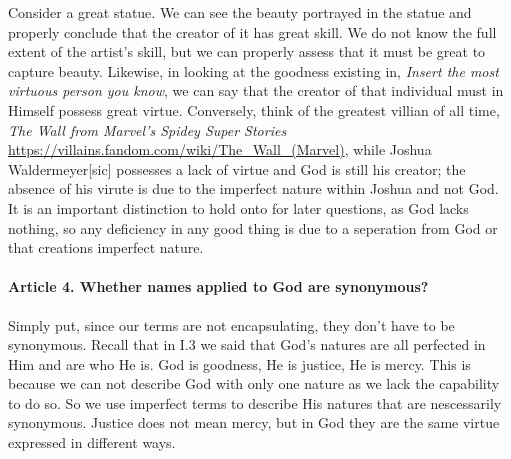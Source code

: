 \documentclass{ucetd}
\begin{document}
Consider a great statue. We can see the beauty portrayed in the statue and properly conclude that the creator of it has great skill. We do not know the full extent of the artist's skill, but we can properly assess that it must be great to capture beauty. Likewise, in looking at the goodness existing in, \textit{Insert the most virtuous person you know}, we can say that the creator of that individual must in Himself possess great virtue.
Conversely, think of the greatest villian of all time, \textit{The Wall from Marvel's Spidey Super Stories} \url{https://villains.fandom.com/wiki/The_Wall_(Marvel)}, while Joshua Waldermeyer[sic] possesses a lack of virtue and God is still his creator; the absence of his virute is due to the imperfect nature within Joshua and not God. It is an important distinction to hold onto for later questions, as God lacks nothing, so any deficiency in any good thing is due to a seperation from God or that creations imperfect nature. 

\paragraph{Article 4. Whether names applied to God are synonymous?}
Simply put, since our terms are not encapsulating, they don't have to be synonymous. Recall that in I.3 we said that God's natures are all perfected in Him and are who He is. God is goodness, He is justice, He is mercy. This is because we can not describe God with only one nature as we lack the capability to do so. So we use imperfect terms to describe His natures that are nescessarily synonymous. Justice does not mean mercy, but in God they are the same virtue expressed in different ways.
\end{document}
